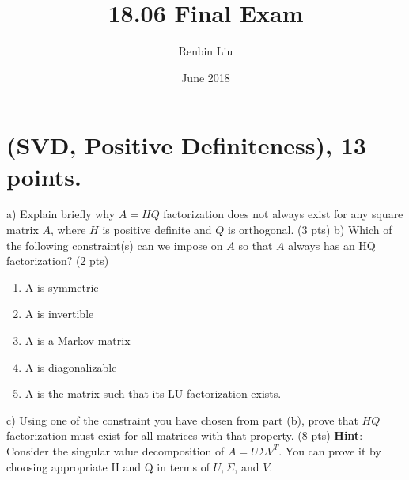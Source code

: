 \documentclass{article}
\title{18.06 Final Exam}
\author{Renbin Liu }
\date{June 2018}
\begin{document}
\maketitle

\section{ (SVD, Positive Definiteness), 13 points. }
\newline a) Explain briefly why \(A = HQ\) factorization does not always exist for any square matrix \(A\), where \(H\) is positive definite and \(Q\) is orthogonal. (3 pts)
\newline
\newline b) Which of the following constraint(s) can we impose on \(A\) so that \(A\) always has an HQ factorization? (2 pts)
\begin{enumerate}
    \item A is symmetric
    \item A is invertible
    \item A is a Markov matrix
    \item A is diagonalizable
    \item A is the matrix such that its LU factorization exists.
\end{enumerate}
\newline
\newline c) Using one of the constraint you have chosen from part (b), prove that \(HQ\) factorization must exist for all matrices with that property. (8 pts)
\newline \textbf{Hint}: Consider the singular value decomposition of \(A = U\Sigma V^T\). You can prove it by choosing appropriate H and Q in terms of \(U, \Sigma\), and \(V\).
\newline 
\end{document}
